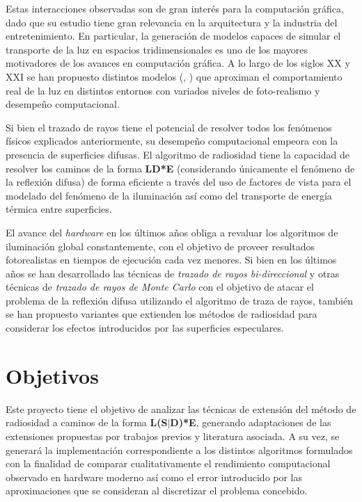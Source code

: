 Estas interacciones observadas son de gran interés para la computación gráfica, dado que su estudio tiene gran relevancia en la arquitectura y la industria del entretenimiento. En particular, la generación de modelos capaces de simular el transporte de la luz en espacios tridimensionales es uno de los mayores motivadores de los avances en computación gráfica. A lo largo de los siglos XX y XXI se han propuesto distintos modelos (\cite{Kajiya}, \cite{Cohen}) que aproximan el comportamiento real de la luz en distintos entornos con variados niveles de foto-realismo y desempeño computacional.

Si bien el trazado de rayos tiene el potencial de resolver todos los fenómenos físicos explicados anteriormente, su desempeño computacional empeora con la presencia de superficies difusas. El algoritmo de radiosidad tiene la capacidad de resolver los caminos de la forma \textbf{LD*E} (considerando únicamente el fenómeno de la reflexión difusa) de forma eficiente a través del uso de factores de vista para el modelado del fenómeno de la iluminación así como del transporte de energía térmica entre superficies.

El avance del \textit{hardware} en los últimos años obliga a revaluar los algoritmos de iluminación global constantemente, con el objetivo de proveer resultados fotorealistas en tiempos de ejecución cada vez menores. Si bien en los últimos años se han desarrollado las técnicas de \textit{trazado de rayos bi-direccional} y otras técnicas de \textit{trazado de rayos de Monte Carlo} con el objetivo de atacar el problema de la reflexión difusa utilizando el algoritmo de traza de rayos, también se han propuesto variantes que extienden los métodos de radiosidad para considerar los efectos introducidos por las superficies especulares.


\section{Objetivos}
\label{sec:objetivos}

Este proyecto tiene el objetivo de analizar las técnicas de extensión del método de radiosidad a caminos de la forma \textbf{L(S$|$D)*E}, generando adaptaciones de las extensiones propuestas por trabajos previos y literatura asociada. A su vez, se generará la implementación correspondiente a los distintos algoritmos formulados con la finalidad de comparar cualitativamente el rendimiento computacional observado en hardware moderno así como el error introducido por las aproximaciones que se consideran al discretizar el problema concebido.


